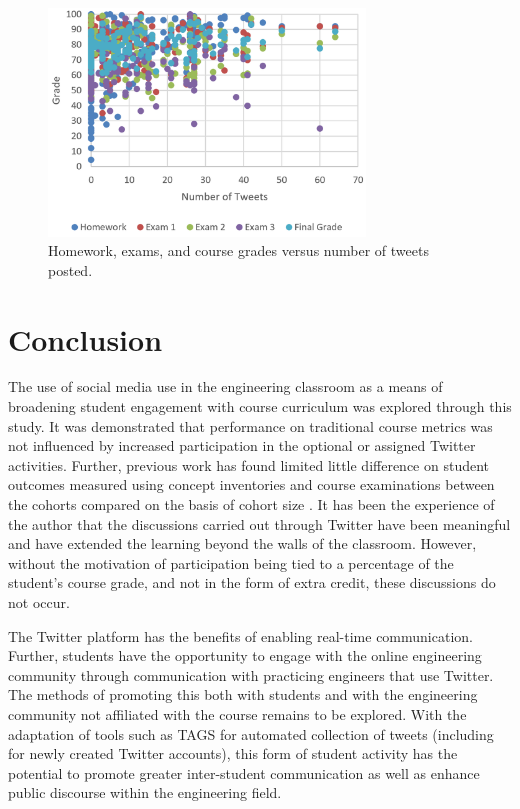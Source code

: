 \documentclass[12pt]{article}
\begin{document}
\begin{figure}[hbtp]
\centering
\includegraphics[width=0.75\textwidth]{figures/numTweets.png}
\caption{Homework, exams, and course grades versus number of tweets posted.}
\label{fig:numTweets}
\end{figure}



\section*{Conclusion}
The use of social media use in the engineering classroom as a means of broadening student engagement with course curriculum was explored through this study. It was demonstrated that performance on traditional course metrics was not influenced by increased participation in the optional or assigned Twitter activities. Further, previous work has found limited little difference on student outcomes measured using concept inventories and course examinations between the cohorts compared on the basis of cohort size \cite{berg_relationship_2015}. It has been the experience of the author that the discussions carried out through Twitter have been meaningful and have extended the learning beyond the walls of the classroom. However, without the motivation of participation being tied to a percentage of the student's course grade, and not in the form of extra credit, these discussions do not occur. 

The Twitter platform has the benefits of enabling real-time communication. Further, students have the opportunity to engage with the online engineering community through communication with practicing engineers that use Twitter. The methods of promoting this both with students and with the engineering community not affiliated with the course remains to be explored. With the adaptation of tools such as TAGS for automated collection of tweets (including for newly created Twitter accounts), this form of student activity has the potential to promote greater inter-student communication as well as enhance public discourse within the engineering field.
\end{document}
